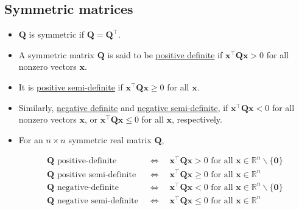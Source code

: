 \documentclass[12pt,thmsa]{article}
\begin{document}
\subsection{Symmetric matrices}
\begin{itemize}
	\item \(\boldsymbol{Q}\) is symmetric if \(\boldsymbol{Q}=\boldsymbol{Q}^{\top}\).
	
	\item A symmetric matrix \(\boldsymbol{Q}\) is said to be \underline{positive definite} if \(\boldsymbol{x}^{\top} \boldsymbol{Q} \boldsymbol{x}>0\) for {\color{red}all nonzero} vectors \(\boldsymbol{x}\).
	
	\item It is \underline{positive semi-definite} if \(\boldsymbol{x}^{\top} \boldsymbol{Q} \boldsymbol{x} \geq 0\) for {\color{red}all} \(\boldsymbol{x}\).
	
	\item Similarly, \underline{negative definite} and \underline{negative semi-definite},  if \(\boldsymbol{x}^{\top} \boldsymbol{Q} \boldsymbol{x}<0\) for {\color{red}all nonzero} vectors \(\boldsymbol{x}\), or \(\boldsymbol{x}^{\top} \boldsymbol{Q} \boldsymbol{x} \leq 0\) for {\color{red}all} \(\boldsymbol{x}\), respectively.
	
	\item For an \(n \times n\) symmetric real matrix \(\boldsymbol{Q}\),
	
	\begin{equation*}
		\begin{aligned}
			\boldsymbol{Q} \text{ positive-definite }  &  \Longleftrightarrow \quad \boldsymbol{x}^{\top} \boldsymbol{Q} \boldsymbol{x}>0 \text { for all } \boldsymbol{x} \in \mathbb{R}^n \backslash\{\boldsymbol{0}\} \\
			\boldsymbol{Q}  \text{ positive semi-definite } & \Longleftrightarrow \quad \boldsymbol{x}^{\top} \boldsymbol{Q} \boldsymbol{x} \geq 0 \text{ for all } \boldsymbol{x} \in \mathbb{R}^n \\
			\boldsymbol{Q} \text { negative-definite } & \Longleftrightarrow \quad \boldsymbol{x}^{\top} \boldsymbol{Q} \boldsymbol{x}<0 \text { for all } \boldsymbol{x} \in \mathbb{R}^n \backslash\{\boldsymbol{0}\} \\
			\boldsymbol{Q} \text { negative semi-definite } &\Longleftrightarrow \quad \boldsymbol{x}^{\top} \boldsymbol{Q} \boldsymbol{x} \leq 0 \text { for all } \boldsymbol{x} \in \mathbb{R}^n
		\end{aligned}
	\end{equation*}


\end{itemize}
\end{document}
